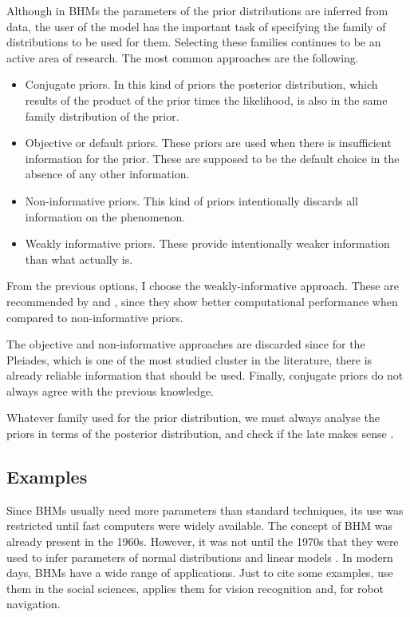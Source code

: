 {\color{blue}
Although in BHMs the parameters of the prior distributions are inferred from data, the user of the model has the important task of specifying the family of distributions to be used for them. Selecting these families continues to be an active area of research. The most common approaches are the following.

\begin{itemize}
\item Conjugate priors. In this kind of priors the posterior distribution, which results of the product of the prior times the likelihood, is also in the same family distribution of the prior. 

\item Objective or default priors. These priors are used when there is insufficient information  for the prior. These are supposed to be the default choice in the absence of any other information.

\item Non-informative priors. This kind of priors intentionally discards all information on the phenomenon.

\item Weakly informative priors. These provide intentionally weaker information than what actually is. 
\end{itemize}

From the previous options, I choose the weakly-informative approach. These are recommended by \citet{Gelman2006,Gelman2008,Huang2013} and \citet{Chung2015}, since they show better computational performance when compared to non-informative priors.

The objective and non-informative approaches are discarded since for the Pleiades, which is one of the most studied cluster in the literature, there is already reliable information that should be used. Finally, conjugate priors do not always agree with the previous knowledge. 

Whatever family used for the prior distribution, we must always analyse the priors in terms of the posterior distribution, and check if the late makes sense \cite[][ Chap. 6]{Gelman2006,Gelman2013}.
}

\subsection{Examples}
Since BHMs usually need more parameters than standard techniques, its use was restricted until fast computers were widely available. The concept of BHM was already present in the 1960s. However, it was not until  the 1970s that they were used to infer parameters of normal distributions and linear models \cite[see][for an historical perspective of BHMs]{Good1980}. In modern days, BHMs have a wide range of applications. Just to cite some examples, \citet{Gelman2007} use them in the social sciences, \citet{Fei2005} applies them for vision recognition and, \citet{Diard2008} for robot navigation.

